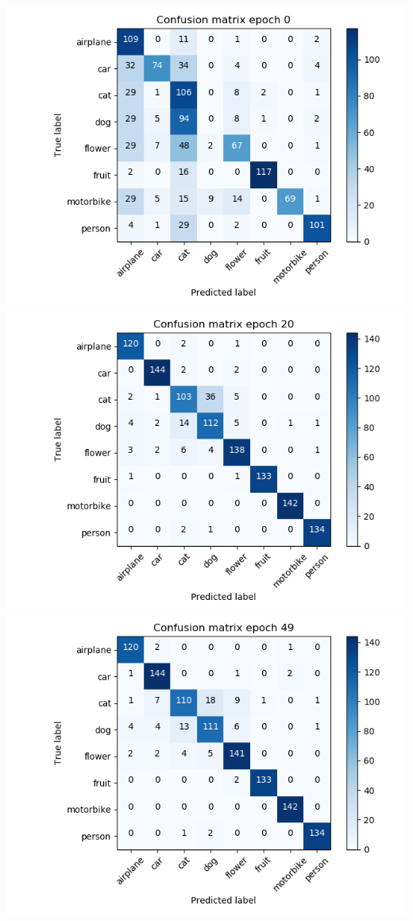 \documentclass{article}
\begin{document}
\begin{minipage}[c]{\linewidth}
	\centering
	\includegraphics[width=\figureWidth\textwidth]{./figures/cm_h64_w64_r_adasyn_e0.png}
	\includegraphics[width=\figureWidth\textwidth]{./figures/cm_h64_w64_r_adasyn_e20.png}
	\includegraphics[width=\figureWidth\textwidth]{./figures/cm_h64_w64_r_adasyn_e49.png}
	

\end{minipage}
\end{document}
